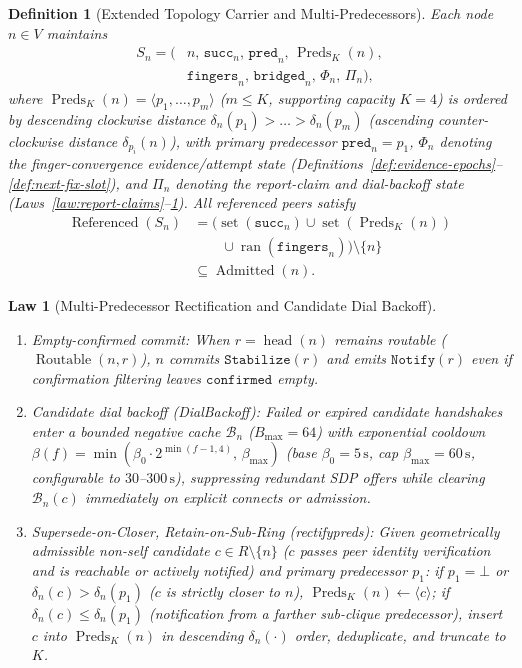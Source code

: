 \documentclass[journal]{IEEEtran}
\newtheorem{definition}{Definition}
\newtheorem{law}{Law}
\DeclareRobustCommand{\code}[1]{{\ttfamily\renewcommand{\_}{\textunderscore\allowbreak}#1}}
\begin{document}
\begin{definition}[Extended Topology Carrier and Multi-Predecessors]\label{def:multi-preds}
Each node $n\in V$ maintains
\[
\begin{aligned}
  S_n=\bigl(&n,\,\texttt{succ}_n,\,\texttt{pred}_n,\,\operatorname{Preds}_K(n),\\
  &\texttt{fingers}_n,\,\texttt{bridged}_n,\,\Phi_n,\,\Pi_n\bigr),
\end{aligned}
\]
where $\operatorname{Preds}_K(n)=\langle p_1,\dots,p_m\rangle$ ($m\le K$, supporting capacity $K=4$) is ordered by descending clockwise distance $\delta_n(p_1)>\dots>\delta_n(p_m)$ (ascending counter-clockwise distance $\delta_{p_i}(n)$), with primary predecessor $\texttt{pred}_n=p_1$, $\Phi_n$ denoting the finger-convergence evidence/attempt state (Definitions~\ref{def:evidence-epochs}--\ref{def:next-fix-slot}), and $\Pi_n$ denoting the report-claim and dial-backoff state (Laws~\ref{law:report-claims}--\ref{law:rectify-backoff}).  All referenced peers satisfy
\[
\begin{aligned}
  \operatorname{Referenced}(S_n)
  &=\bigl(\operatorname{set}(\texttt{succ}_n)\cup\operatorname{set}(\operatorname{Preds}_K(n))\\
  &\qquad\cup\operatorname{ran}(\texttt{fingers}_n)\bigr)\setminus\{n\}\\
  &\subseteq\operatorname{Admitted}(n).
\end{aligned}
\]
\end{definition}

\begin{law}[Multi-Predecessor Rectification and Candidate Dial Backoff]\label{law:rectify-backoff}
\leavevmode
\begin{enumerate}[leftmargin=1.5em]
\item \emph{Empty-confirmed commit:} When $r=\operatorname{head}(n)$ remains
routable ($\operatorname{Routable}(n,r)$), $n$ commits $\texttt{Stabilize}(r)$
and emits $\texttt{Notify}(r)$ even if confirmation filtering leaves
$\texttt{confirmed}$ empty.
\item \emph{Candidate dial backoff (\code{DialBackoff}):} Failed or expired
candidate handshakes enter a bounded negative cache $\mathcal{B}_n$ ($B_{\max}=64$)
with exponential cooldown $\beta(f)=\min(\beta_0\cdot 2^{\min(f-1,4)},\allowbreak\,\beta_{\max})$
(base $\beta_0=5\,\mathrm{s}$, cap $\beta_{\max}=60\,\mathrm{s}$, configurable to $30$--$300\,\mathrm{s}$), suppressing redundant SDP offers while clearing $\mathcal{B}_n(c)$ immediately on explicit connects or admission.
\item \emph{Supersede-on-Closer, Retain-on-Sub-Ring (\code{rectify\_preds}):}
Given geometrically admissible non-self candidate $c\in R\setminus\{n\}$ ($c$ passes peer identity verification and is reachable or actively notified) and primary predecessor $p_1$: if
$p_1=\bot$ or $\delta_n(c)>\delta_n(p_1)$ ($c$ is strictly closer to $n$),
$\operatorname{Preds}_K(n)\gets\langle c\rangle$; if $\delta_n(c)\le\delta_n(p_1)$
(notification from a farther sub-clique predecessor), insert $c$ into
$\operatorname{Preds}_K(n)$ in descending $\delta_n(\cdot)$ order, deduplicate,
and truncate to $K$.
\end{enumerate}
\end{law}
\end{document}
